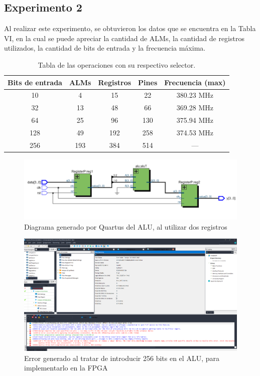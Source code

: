 \documentclass[journal]{IEEEtran}
\begin{document}
	
	\subsection{Experimento 2}
	
	Al realizar este experimento, se obtuvieron los datos que se encuentra en la Tabla VI, en la cual se puede apreciar la cantidad de ALMs, la cantidad de registros utilizados, la cantidad de bits de entrada y la frecuencia máxima. 
	
	\begin{table}[hbtp]
		\begin{center}
			\caption{Tabla de las operaciones con su respectivo selector.}
			\label{tab:tablaf}
			
			\begin{tabular}{c | c | c | c | c }
				\hline
				\textbf{Bits de entrada} & \textbf{ALMs} & \textbf{Registros} &
				\textbf{Pines} &
				\textbf{Frecuencia (max)} \\
				\hline 10 & 4 & 15 & 22 & 380.23 MHz  \\
				\hline  32 & 13 & 48 & 66 & 369.28 MHz  \\
				\hline 64 & 25 & 96 & 130 & 375.94 MHz \\
				\hline 128 & 49 & 192 & 258 & 374.53 MHz\\
				\hline 256 & 193 & 384 & 514 & ---  \\
			\end{tabular}
		\end{center}
	\end{table}
	
	\begin{figure}[hbtp]
		\centering
		\includegraphics[scale = 0.3]{img/nivel32.png}
		\caption{Diagrama generado por Quartus del ALU, al utilizar dos registros}
		\label{fig:niv32}
	\end{figure}
	
	\begin{figure}[hbtp]
		\centering
		\includegraphics[scale = 0.12]{img/error.png}
		\caption{Error generado al tratar de introducir 256 bits en el ALU, para implementarlo en la FPGA}
		\label{fig:err}
	\end{figure}
	
\end{document}
